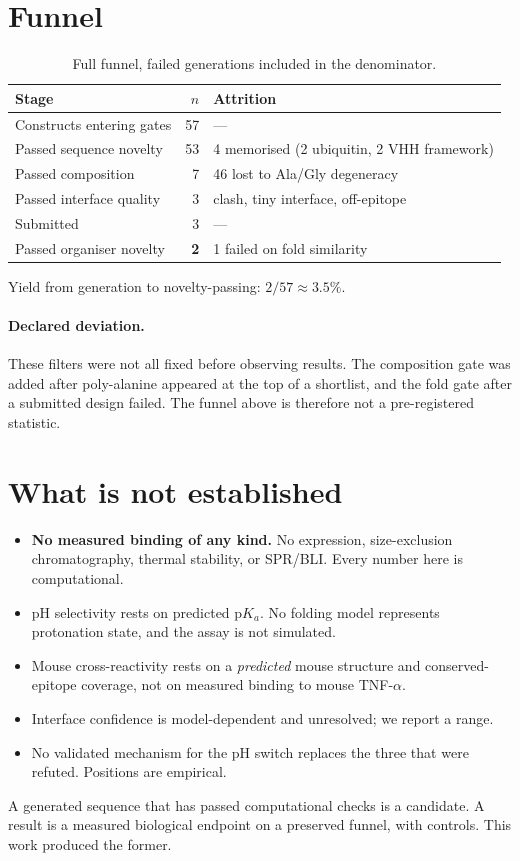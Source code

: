 \documentclass[11pt,a4paper]{article}
\begin{document}
\section{Funnel}

\begin{table}[htbp]
\centering
\caption{Full funnel, failed generations included in the denominator.}
\begin{tabular}{lrl}
\toprule
Stage & $n$ & Attrition \\
\midrule
Constructs entering gates & 57 & --- \\
Passed sequence novelty & 53 & 4 memorised (2 ubiquitin, 2 VHH framework) \\
Passed composition & 7 & 46 lost to Ala/Gly degeneracy \\
Passed interface quality & 3 & clash, tiny interface, off-epitope \\
Submitted & 3 & --- \\
Passed organiser novelty & \textbf{2} & 1 failed on fold similarity \\
\bottomrule
\end{tabular}
\end{table}

Yield from generation to novelty-passing: $2/57 \approx 3.5\%$.

\paragraph{Declared deviation.} These filters were not all fixed before observing results. The
composition gate was added after poly-alanine appeared at the top of a shortlist, and the fold
gate after a submitted design failed. The funnel above is therefore not a pre-registered
statistic.

\section{What is not established}

\begin{itemize}
\item \textbf{No measured binding of any kind.} No expression, size-exclusion chromatography,
thermal stability, or SPR/BLI. Every number here is computational.
\item pH selectivity rests on predicted p$K_a$. No folding model represents protonation state,
and the assay is not simulated.
\item Mouse cross-reactivity rests on a \emph{predicted} mouse structure and conserved-epitope
coverage, not on measured binding to mouse TNF-$\alpha$.
\item Interface confidence is model-dependent and unresolved; we report a range.
\item No validated mechanism for the pH switch replaces the three that were refuted. Positions
are empirical.
\end{itemize}

A generated sequence that has passed computational checks is a candidate. A result is a measured
biological endpoint on a preserved funnel, with controls. This work produced the former.
\end{document}

